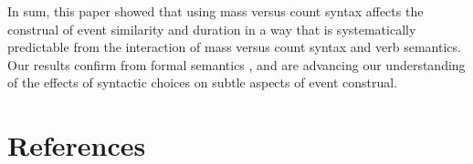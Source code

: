\documentclass[review,12pt,authoryear]{elsarticle}
\newcommand*{\sectionformat}{\centering}
\begin{document}
In sum, this paper showed that using mass versus count syntax affects the construal of event similarity and duration in a way that is systematically predictable from the interaction of mass versus count syntax and verb semantics. Our results confirm  from formal semantics , and are advancing our understanding of the effects of syntactic choices on subtle aspects of event construal.

\newpage

\clearpage
\section*{\sectionformat References}



\end{document}
